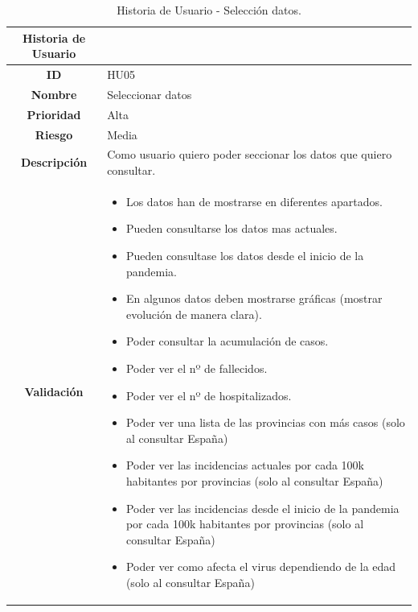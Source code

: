 \begin{table}[H]
	\begin{center}
		\begin{tabular}{| c | p{9cm} |}
			\hline
			
			Historia de Usuario &  \\ \hline
			
			
			\textbf{ID} & HU05 \\
			\textbf{Nombre} & Seleccionar datos \\
			\textbf{Prioridad} & Alta \\
			\textbf{Riesgo} & Media \\
			\textbf{Descripción} & Como usuario quiero poder seccionar los datos que quiero consultar. \\
			\textbf{Validación} & \begin{itemize}
				\item Los datos han de mostrarse en diferentes apartados.
				\item Pueden consultarse los datos mas actuales.
				\item Pueden consultase los datos desde el inicio de la pandemia.
				\item En algunos datos deben mostrarse gráficas (mostrar evolución de manera clara).
				\item Poder consultar la acumulación de casos.
				\item Poder ver el nº de fallecidos.
				\item Poder ver el nº de hospitalizados.
				\item Poder ver una lista de las provincias con más casos (solo al consultar España)
				\item Poder ver las incidencias actuales por cada 100k habitantes por provincias (solo al consultar España)
				\item Poder ver las incidencias desde el inicio de la pandemia por cada 100k habitantes por provincias (solo al consultar España)
				\item Poder ver como afecta el virus dependiendo de la edad (solo al consultar España)
			\end{itemize} \\ \hline
		\end{tabular}
		\caption{Historia de Usuario - Selección datos.}
	\end{center}
\end{table}

